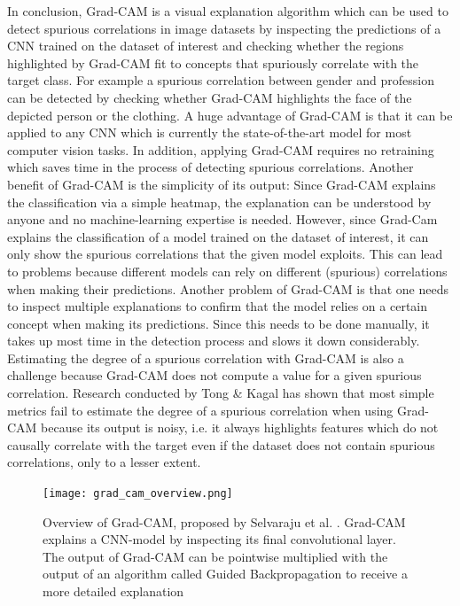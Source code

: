 \documentclass{article}
\begin{document}
In conclusion, Grad-CAM is a visual explanation algorithm which can be used to detect spurious correlations in image datasets by inspecting the predictions of a CNN trained on the dataset of interest and checking whether the regions highlighted by Grad-CAM fit to concepts that spuriously correlate with the target class. For example a spurious correlation between gender and profession can be detected by checking whether Grad-CAM highlights the face of the depicted person or the clothing. 
A huge advantage of Grad-CAM is that it can be applied to any CNN which is currently the state-of-the-art model for most computer vision tasks. In addition, applying Grad-CAM requires no retraining which saves time in the process of detecting spurious correlations. Another benefit of Grad-CAM is the simplicity of its output: Since Grad-CAM explains the classification via a  simple heatmap, the explanation can be understood by anyone and no machine-learning expertise is needed. 
However, since Grad-Cam explains the classification of a model trained on the dataset of interest, it can only show the spurious correlations that the given model exploits. This can lead to problems because different models can rely on different (spurious) correlations when making their predictions.
Another problem of Grad-CAM is that one needs to inspect multiple explanations to confirm that the model relies on a certain concept when making its predictions. Since this needs to be done manually, it takes up most time in the detection process and slows it down considerably. Estimating the degree of a spurious correlation with Grad-CAM is also a challenge because Grad-CAM does not compute a value for a given spurious correlation. Research conducted by Tong \& Kagal \cite{tong2020investigating} has shown that most simple metrics fail to estimate the degree of a spurious correlation when using Grad-CAM because its output is noisy, i.e. it always highlights features which do not causally correlate with the target even if the dataset does not contain spurious correlations, only to a lesser extent.

\begin{figure}
    \centering
    \texttt{[image: grad\_cam\_overview.png]}
    \caption{Overview of Grad-CAM, proposed by Selvaraju et al. \cite{Selvaraju_2017_ICCV}. Grad-CAM explains a CNN-model by inspecting its final convolutional layer. The output of Grad-CAM can be pointwise multiplied with the output of an algorithm called Guided Backpropagation \cite{springenberg2015striving} to receive a more detailed explanation}
    \label{fig:gradcam}
\end{figure}
\end{document}
